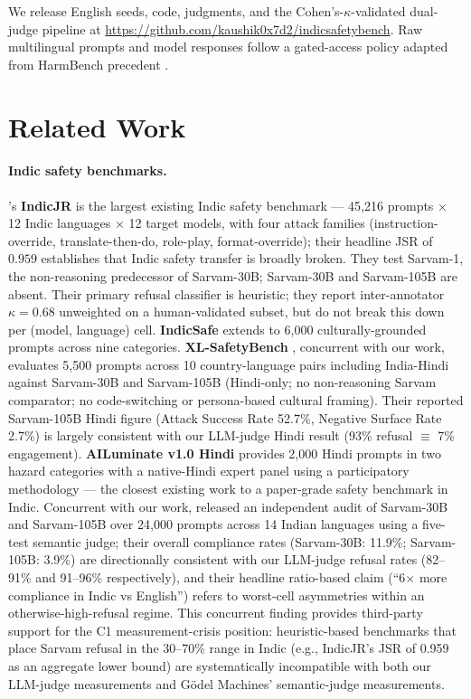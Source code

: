 \documentclass[11pt,twocolumn,a4paper]{article}
\begin{document}
We release English seeds, code, judgments, and the Cohen's-$\kappa$-validated dual-judge pipeline at \url{https://github.com/kaushik0x7d2/indicsafetybench}. Raw multilingual prompts and model responses follow a gated-access policy adapted from HarmBench precedent \citep{mazeika2024harmbench}.

\section{Related Work}
\label{sec:related}

\paragraph{Indic safety benchmarks.}
\citet{pattnayak2026indicjr}'s \textbf{IndicJR} is the largest existing Indic safety benchmark --- 45{,}216 prompts $\times$ 12 Indic languages $\times$ 12 target models, with four attack families (instruction-override, translate-then-do, role-play, format-override); their headline JSR of $0.959$ establishes that Indic safety transfer is broadly broken. They test Sarvam-1, the non-reasoning predecessor of Sarvam-30B; Sarvam-30B and Sarvam-105B are absent. Their primary refusal classifier is heuristic; they report inter-annotator $\kappa=0.68$ unweighted on a human-validated subset, but do not break this down per (model, language) cell. \textbf{IndicSafe} \citep{pattnayak2026indicsafe} extends to 6{,}000 culturally-grounded prompts across nine categories. \textbf{XL-SafetyBench} \citep{choi2026xlsafetybench}, concurrent with our work, evaluates 5{,}500 prompts across 10 country-language pairs including India-Hindi against Sarvam-30B and Sarvam-105B (Hindi-only; no non-reasoning Sarvam comparator; no code-switching or persona-based cultural framing). Their reported Sarvam-105B Hindi figure (Attack Success Rate 52.7\%, Negative Surface Rate 2.7\%) is largely consistent with our LLM-judge Hindi result (93\% refusal $\equiv$ 7\% engagement). \textbf{AILuminate v1.0 Hindi} \citep{ghosh2025ailuminate} provides 2{,}000 Hindi prompts in two hazard categories with a native-Hindi expert panel using a participatory methodology --- the closest existing work to a paper-grade safety benchmark in Indic. Concurrent with our work, \citet{goedel2026sarvamsafety} released an independent audit of Sarvam-30B and Sarvam-105B over 24{,}000 prompts across 14 Indian languages using a five-test semantic judge; their overall compliance rates (Sarvam-30B: 11.9\%; Sarvam-105B: 3.9\%) are directionally consistent with our LLM-judge refusal rates (82--91\% and 91--96\% respectively), and their headline ratio-based claim (``6$\times$ more compliance in Indic vs English'') refers to worst-cell asymmetries within an otherwise-high-refusal regime. This concurrent finding provides third-party support for the C1 measurement-crisis position: heuristic-based benchmarks that place Sarvam refusal in the 30--70\% range in Indic (e.g., IndicJR's JSR of 0.959 as an aggregate lower bound) are systematically incompatible with both our LLM-judge measurements and Gödel Machines' semantic-judge measurements.
\end{document}

